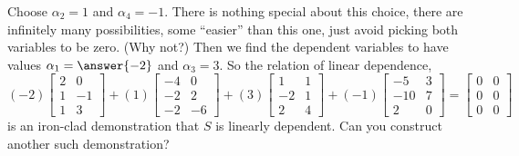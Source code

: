\documentclass{ximera}
\begin{document}
\begin{example}
  Choose $\alpha_2=1$ and $\alpha_4=-1$.  There is nothing special
  about this choice, there are infinitely many possibilities, some
  ``easier'' than this one, just avoid picking both variables to be
  zero.  (Why not?) Then we find the dependent variables to have
  values $\alpha_1=\answer{-2}$ and $\alpha_3=3$.  So the relation of
  linear dependence,
  \[
    (-2)\begin{bmatrix}
      2 & 0\\ 1 & -1\\ 1 & 3
    \end{bmatrix}+
    (1)\begin{bmatrix}
      -4 & 0\\ -2 & 2\\ -2 & -6
    \end{bmatrix}+
    (3)\begin{bmatrix}
      1 & 1\\ -2 & 1\\ 2 & 4
    \end{bmatrix}+
    (-1)\begin{bmatrix}
      -5 & 3\\ -10 & 7\\ 2 & 0
    \end{bmatrix}
    =
    \begin{bmatrix}
      0&0\\0&0\\0&0
    \end{bmatrix}
  \]
  is an iron-clad demonstration that $S$ is linearly dependent.  Can you construct another such demonstration?
\end{example}
\end{document}
